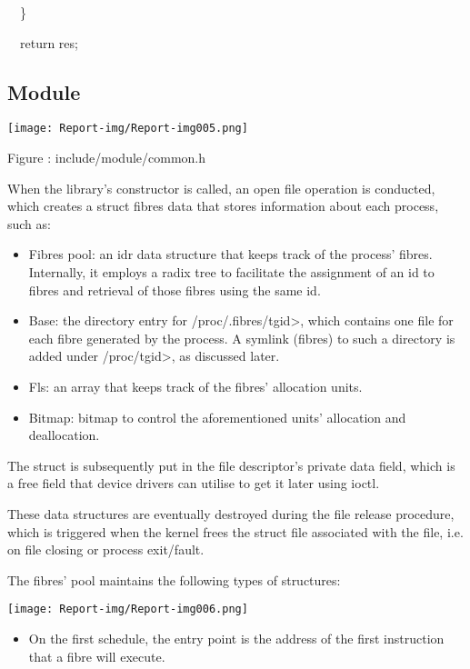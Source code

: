 \bigskip

\ \ \}


\bigskip

\ \ return res;

\subsection{Module}

 \texttt{[image: Report-img/Report-img005.png]} 

Figure : include/module/common.h

When the library's constructor is called, an open file operation is conducted, which creates a struct fibres data that stores information about each process, such as:

\begin{itemize}
\item Fibres pool: an idr data structure that keeps track of the process' fibres. Internally, it employs a radix tree to facilitate the assignment of an id to fibres and retrieval of those fibres using the same id.
\item Base: the directory entry for /proc/.fibres/tgid{\textgreater}, which contains one file for each fibre generated by the process. A symlink (fibres) to such a directory is added under /proc/tgid{\textgreater}, as discussed later.
\item Fls: an array that keeps track of the fibres' allocation units.
\item Bitmap: bitmap to control the aforementioned units' allocation and deallocation.
\end{itemize}
The struct is subsequently put in the file descriptor's private data field, which is a free field that device drivers can utilise to get it later using ioctl.

These data structures are eventually destroyed during the file release procedure, which is triggered when the kernel frees the struct file associated with the file, i.e. on file closing or process exit/fault.

The fibres' pool maintains the following types of structures:

 \texttt{[image: Report-img/Report-img006.png]} 


\bigskip

\begin{itemize}
\item On the first schedule, the entry point is the address of the first instruction that a fibre will execute.
\end{itemize}

